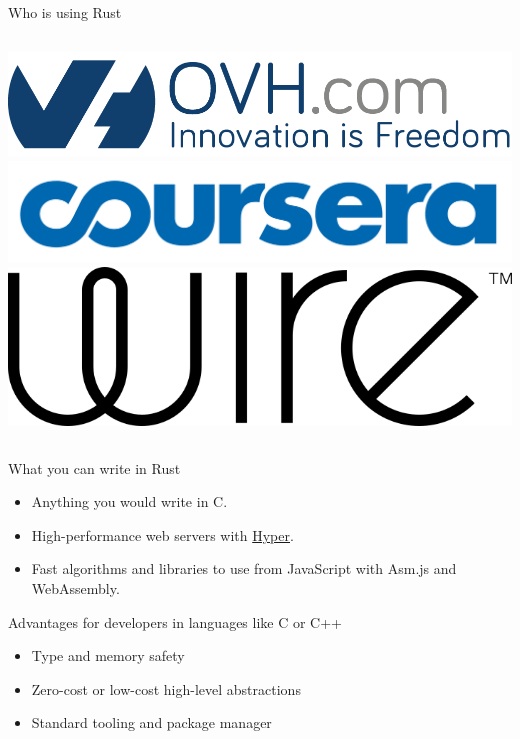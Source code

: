 \documentclass[12pt, aspectratio=169]{beamer}
\begin{document}
\begin{frame}{Who is using Rust}
  \begin{columns}
    \includegraphics[width=\textwidth]{images/ovh.png}
    \includegraphics[width=\textwidth]{images/coursera.png}
    \includegraphics[width=\textwidth]{images/wire.png}
  \end{columns}
\end{frame}

\begin{frame}{What you can write in Rust}
  \begin{itemize}
    \item Anything you would write in C.
    \item High-performance web servers with \href{https://hyper.rs/}{Hyper}.
    \item Fast algorithms and libraries to use from JavaScript with Asm.js and
      WebAssembly.
  \end{itemize}
\end{frame}

\begin{frame}{Advantages for developers in languages like C or C++}
  \begin{itemize}
    \item Type and memory safety
    \item Zero-cost or low-cost high-level abstractions
    \item Standard tooling and package manager
  \end{itemize}
\end{frame}
\end{document}
